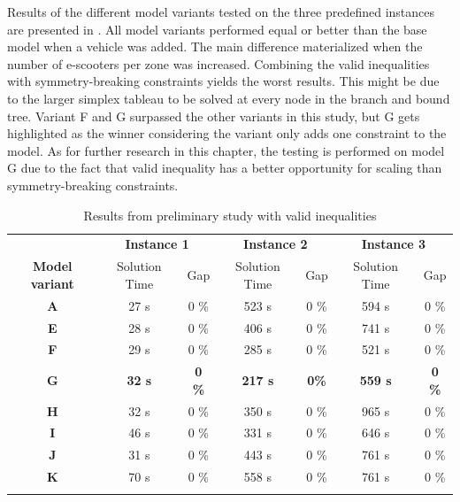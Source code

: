 Results of the different model variants tested on the three predefined instances are presented in . All model variants performed equal or better than the base model when a vehicle was added. The main difference materialized when the number of e-scooters per zone was increased. Combining the valid inequalities with symmetry-breaking constraints yields the worst results. This might be due to the larger simplex tableau to be solved at every node in the branch and bound tree. Variant F and G surpassed the other variants in this study, but G gets highlighted as the winner considering the variant only adds one constraint to the model. As for further research in this chapter, the testing is performed on model G due to the fact that valid inequality has a better opportunity for scaling than symmetry-breaking constraints. 
\\
\begin{table}[H]
    \centering
    \caption{Results from preliminary study with valid inequalities}
    \begin{tabular}{c c c c c c c}
        \thickhline
         & \multicolumn{2}{c}{\textbf{Instance 1}} & \multicolumn{2}{c}{\textbf{Instance 2}} & \multicolumn{2}{c}{\textbf{Instance 3}}  \\
        \thickhline
        \textbf{Model variant} & Solution Time & Gap & Solution Time & Gap & Solution Time & Gap \\
        \hline
        \textbf{A} & 27 s & 0 \% & 523 s & 0 \% & 594 s & 0 \% \\
        \textbf{E} & 28 s & 0 \% & 406 s & 0 \% & 741 s & 0 \% \\
        \textbf{F} & 29 s & 0 \% & 285 s & 0 \% & 521 s & 0 \% \\
        \textbf{G} & \textbf{32 s} & \textbf{0 \%} & \textbf{217 s} & \textbf{0\%} & \textbf{559 s} & \textbf{0 \%} \\
        \textbf{H} & 32 s & 0 \% & 350 s & 0 \% & 965 s & 0 \% \\
        \textbf{I} & 46 s & 0 \% & 331 s & 0 \% & 646 s & 0 \% \\
        \textbf{J} & 31 s & 0 \% & 443 s & 0 \% & 761 s & 0 \% \\
        \textbf{K} & 70 s & 0 \% & 558 s & 0 \% & 761 s & 0 \% \\
        
        \thickhline
        \end{tabular}
    \label{results_valid_inequalities_preliminary}
\end{table}


